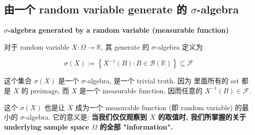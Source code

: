 \documentclass{qlnotes-export}
\begin{document}
\subsection{\texorpdfstring{由一个 random variable generate 的 \(\sigma\)-algebra}{由一个 random variable generate 的 \textbackslash sigma-algebra}}\label{ux7531ux4e00ux4e2a-random-variable-generate-ux7684-sigma-algebra}

\begin{definition}{\protect{}\label{kn-sigma-algebra-generated-by-a-random-variable-measurable-function}{\textbf{\(\sigma\)-algebra
generated by a random variable (measurable function)}}}

对于 random variable \(X:\Omega\rightarrow{\mathbb{R}}\), 其 generate 的 \(\sigma\)-algebra 定义为

\[\sigma(X) := \left\{ {X^{- 1}(B):B \in \mathcal{B}({\mathbb{R}})} \right\} \subseteq \mathcal{F}\]

\end{definition}

这个集合 \(\sigma(X)\) 是一个 \(\sigma\)-algebra, 是一个 trivial truth. 因为 里面所有的 set 都是 \(X\) 的 preimage, 而 \(X\) 是一个 measurable function, 因而任意的 \(X^{- 1}(B) \in \mathcal{F}\).

这个 \(\sigma(X)\) 也是让 \(X\) 成为一个 measurable function (即 random variable) 的最小的 \(\sigma\)-algebra. 它的意义是: \textbf{当我们仅仅观察到 \(X\) 的取值时, 我们所掌握的关于 underlying sample space \(\Omega\) 的全部 "information".}
\end{document}
